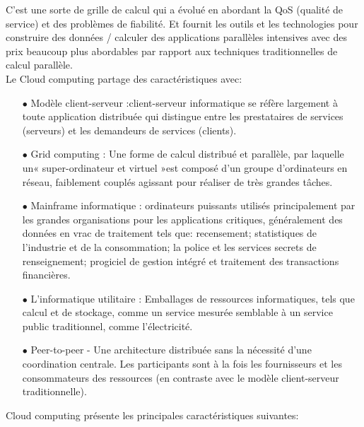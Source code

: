                 C'est une sorte de grille de calcul qui  a évolué en abordant la QoS (qualité de service) et des problèmes de fiabilité. Et fournit les outils et les technologies pour construire des données / calculer  des applications parallèles intensives avec des prix beaucoup plus abordables par rapport aux techniques traditionnelles de calcul parallèle.\\

                Le Cloud computing partage des caractéristiques avec:
            \begin{itemize}
                \item[\quad $\bullet$]Modèle client-serveur :client-serveur informatique se réfère largement à toute application distribuée qui distingue entre les prestataires de services (serveurs) et les demandeurs de services (clients).
                \item[\quad $\bullet$]Grid computing : Une forme de calcul distribué et parallèle, par laquelle un« super-ordinateur et virtuel »est composé d'un groupe d'ordinateurs en réseau, faiblement couplés agissant pour réaliser de très grandes tâches.
                \item[\quad $\bullet$]Mainframe informatique : ordinateurs puissants utilisés principalement par les grandes organisations pour les applications critiques, généralement des données en vrac de traitement tels que: recensement; statistiques de l'industrie et de la consommation; la police et les services secrets de renseignement; progiciel de gestion intégré et traitement des transactions financières.
                \item[\quad $\bullet$]L'informatique utilitaire : Emballages de ressources informatiques, tels que calcul et de stockage, comme un service mesurée semblable à un service public traditionnel, comme l'électricité.
                \item[\quad $\bullet$]Peer-to-peer - Une architecture distribuée sans la nécessité d'une coordination centrale. Les participants sont à la fois les fournisseurs et les consommateurs des ressources (en contraste avec le modèle client-serveur traditionnelle).
            \end{itemize}
            Cloud computing présente les principales caractéristiques suivantes:\\
